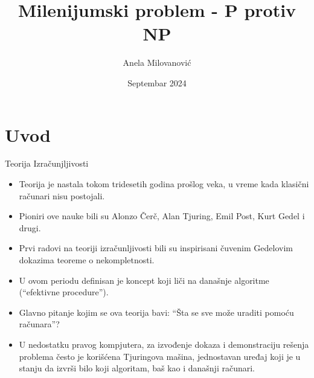 \documentclass[aspectratio=169, xcolor=table, 10pt]{beamer}
\title{Milenijumski problem - P protiv NP}
\author{An\dj ela Milovanovi\' c}
\institute[MATF]{Matematički fakultet u Beogradu}
\date{Septembar 2024}
\theoremstyle{definition}
\begin{document}
\maketitle

\section{Uvod}

\begin{frame}{Teorija Izra\v cunjljivosti}

    \begin{itemize}
        \item Teorija je nastala tokom tridesetih godina prošlog veka, u vreme kada klasični računari nisu postojali.
        \item Pioniri ove nauke bili su Alonzo Čerč, Alan Tjuring, Emil Post, Kurt Gedel i drugi.
        \item Prvi radovi na teoriji izračunljivosti bili su inspirisani čuvenim Gedelovim dokazima teoreme o nekompletnosti.
        \item U ovom periodu definisan je koncept koji liči na današnje algoritme (“efektivne procedure”).
        \item Glavno pitanje kojim se ova teorija bavi: “Šta se sve može uraditi pomoću računara”?
        \item U nedostatku pravog kompjutera, za izvođenje dokaza i demonstraciju rešenja problema često je korišćena Tjuringova mašina, jednostavan uređaj koji je u stanju da izvrši bilo koji algoritam, baš kao i današnji računari.
    \end{itemize}
    
\end{frame}
\end{document}
